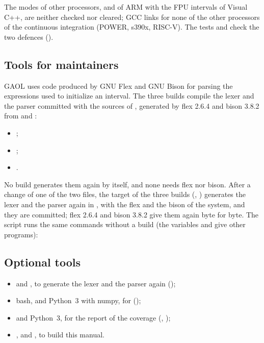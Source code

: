 \noindent
The modes of other processors, and of ARM with the FPU intervals of Visual
C++, are neither checked nor cleared; GCC links  for none
of the other processors of the continuous integration (POWER, s390x, RISC-V).
The tests  and
 check the two defences
().

\subsection{Tools for maintainers}\label{sec:install-maintainers}

GAOL uses code produced by GNU Flex and GNU Bison for parsing the expressions
used to initialize an interval.
%
%
The three builds compile the lexer and the parser committed with the sources
of , generated by flex 2.6.4 and bison 3.8.2 from
 and
:
\begin{itemize}
\item {};
\item {};
\item {}.
\end{itemize}
\noindent
No build generates them again by itself, and none needs flex nor bison. After
a change of one of the two files, the target  of the three builds
(, ) generates the lexer and the parser
again in , with the flex and the bison of the system, and
they are committed; flex 2.6.4 and bison 3.8.2 give them again byte for byte.
The script  runs the same commands
without a build (the variables  and  give other
programs):

\begin{cmdshell}
\end{cmdshell}

\subsection{Optional tools}

\begin{itemize}
\item {} and , to generate the lexer and the parser again
  ();
\item bash, and Python~3 with numpy, for  ();
\item {} and Python~3, for the report of the coverage
  (, );
\item {},  and , to build this manual.
\end{itemize}

